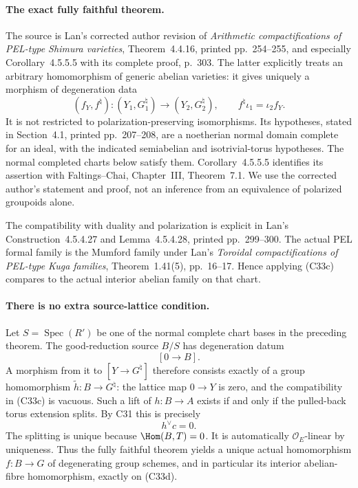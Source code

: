 \paragraph{The exact fully faithful theorem.}
The source is Lan's corrected author revision of
\emph{Arithmetic compactifications of PEL-type Shimura
varieties}, Theorem~4.4.16, printed pp.~254--255, and
especially Corollary~4.5.5.5 with its complete proof,
p.~303. The latter explicitly treats an arbitrary
homomorphism of generic abelian varieties: it gives
uniquely a morphism of degeneration data
\[
 (f_Y,f^{\natural}):(Y_1,G_1^{\natural})
                     \longrightarrow(Y_2,G_2^{\natural}),
 \qquad f^{\natural}\iota_1=\iota_2f_Y.                 \tag{C33c}
\]
It is not restricted to polarization-preserving
isomorphisms. Its hypotheses, stated in Section~4.1,
printed pp.~207--208, are a noetherian normal domain
complete for an ideal, with the indicated semiabelian
and isotrivial-torus hypotheses. The normal completed
charts below satisfy them. Corollary~4.5.5.5 identifies
its assertion with Faltings--Chai, Chapter~III,
Theorem~7.1. We use the corrected author's statement
and proof, not an inference from an equivalence of
polarized groupoids alone.

The compatibility with duality and polarization is
explicit in Lan's Construction~4.5.4.27 and
Lemma~4.5.4.28, printed pp.~299--300. The actual PEL
formal family is the Mumford family under Lan's
\emph{Toroidal compactifications of PEL-type Kuga
families}, Theorem~1.41(5), pp.~16--17. Hence applying
(C33c) compares to the actual interior abelian family
on that chart.

\paragraph{There is no extra source-lattice condition.}
Let $S=\operatorname{Spec}(R')$ be one of the normal
complete chart bases in the preceding theorem. The
good-reduction source $B/S$ has degeneration datum
\[
                         [0\longrightarrow B].
\]
A morphism from it to $[Y\longrightarrow G^{\natural}]$
therefore consists exactly of a group homomorphism
$\widetilde h:B\to G^{\natural}$: the lattice map
$0\to Y$ is zero, and the compatibility in (C33c)
is vacuous. Such a lift of $h:B\to A$ exists if
and only if the pulled-back torus extension splits.
By C31 this is precisely
\[
                              h^\vee c=0.              \tag{C33d}
\]
The splitting is unique because $\Hom(B,T)=0$.
It is automatically $\mathcal O_E$-linear by uniqueness.
Thus the fully faithful theorem yields a unique actual
homomorphism $f:B\to G$ of degenerating group schemes,
and in particular its interior abelian-fibre
homomorphism, exactly on (C33d).

